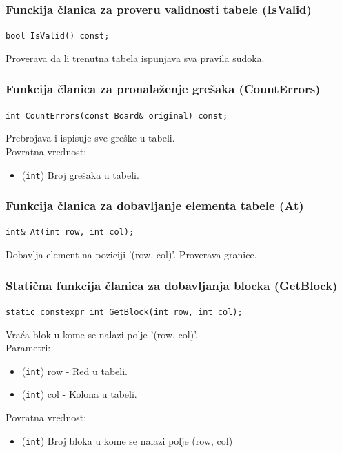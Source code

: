 \documentclass[a4paper]{article}
\begin{document}
    \subsubsection{Funckija članica za proveru validnosti tabele (IsValid)}
    \texttt{bool IsValid() const;}
    \par Proverava da li trenutna tabela ispunjava sva pravila sudoka.
    
    \subsubsection{Funkcija članica za pronalaženje grešaka (CountErrors)}
    \texttt{int CountErrors(const Board\& original) const;}
    \par Prebrojava i ispisuje sve greške u tabeli.\\
    Povratna vrednost:
    \begin{itemize}
        \item (\texttt{int}) Broj grešaka u tabeli.
    \end{itemize}

    \subsubsection{Funkcija članica za dobavljanje elementa tabele (At)}
    \texttt{int\& At(int row, int col);}
    \par Dobavlja element na poziciji '(row, col)'. Proverava granice.
    
    \subsubsection{Statična funkcija članica za dobavljanja blocka (GetBlock)}
    \texttt{static constexpr int GetBlock(int row, int col);}
    \par Vraća blok u kome se nalazi polje '(row, col)'.\\
    Parametri:
    \begin{itemize}
        \item (\texttt{int}) row - Red u tabeli.
        \item (\texttt{int}) col - Kolona u tabeli.
    \end{itemize}
    Povratna vrednost:
    \begin{itemize}
        \item (\texttt{int}) Broj bloka u kome se nalazi polje (row, col)
    \end{itemize}
\end{document}
